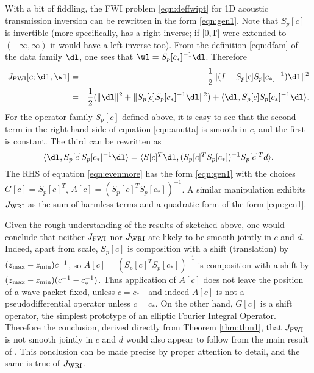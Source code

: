 With a bit of fiddling, the FWI problem \ref{eqn:deffwipt} for 1D 
acoustic transmission inversion can be rewritten in the form \ref{eqn:gen1}. Note
that $S_p[c]$ is invertible (more specifically, has a right inverse; if [0,T] were
extended to $(-\infty,\infty)$ it would have a left inverse too). From
the definition \ref{eqn:dfam} of the data family $\dl$, one sees that
$\wl = S_p[c_*]^{-1}\dl$. Therefore
\begin{eqnarray}
  \label{eqn:anutta}
  J_{\rm FWI}[c;\dl,\wl] &=&
                             \frac{1}{2}\|(I-S_p[c]S_p[c_*]^{-1})\dl\|^2 \nonumber\\
 & =&\frac{1}{2}(\|\dl\|^2 + \|S_p[c]S_p[c_*]^{-1}\dl\|^2) + \langle \dl,
  S_p[c]S_p[c_*]^{-1}\dl\rangle.
\end{eqnarray}
For the operator family $S_p[c]$ defined above, it is easy to see that
the second term in the right hand side of equation \ref{eqn:anutta} is
smooth in $c$, and the first is constant. The third can be rewritten
as
\begin{equation}
  \label{eqn:evenmore}
  \langle \dl,  S_p[c]S_p[c_*]^{-1}\dl\rangle = \langle S[c]^T\dl, 
  (S_p[c]^T S_p[c_*])^{-1}S_p[c]^Td\rangle.
\end{equation}
The RHS of equation \ref{eqn:evenmore} has the form \ref{eqn:gen1} with the choices $G[c]=S_p[c]^T$,
$A[c]=(S_p[c]^T S_p[c_*])^{-1}$. A similar manipulation exhibits
$J_{\rm WRI}$ as the sum of harmless terms and a quadratic form of the
form \ref{eqn:gen1}.

Given the rough understanding of the results of \cite{StolkSymes:03}
sketched above, one would conclude that neither $J_{\rm FWI}$ nor
$J_{\rm WRI}$ are likely to be smooth jointly in $c$ and $d$. Indeed,
apart from scale, $S_p[c]$ is composition with a shift (translation)
by $(z_{\rm max}-z_{\rm min})c^{-1}$, so
$A[c]=(S_p[c]^T S_p[c_*])^{-1}$ is composition with a shift by
$(z_{\rm max}-z_{\rm min})(c^{-1}-c_*^{-1})$. Thus application of
$A[c]$ does not leave the position of a wave packet fixed, unless
$c=c_*$ - and indeed $A[c]$ is not a pseudodifferential operator
unless $c=c_*$. On the other hand, $G[c]$ is a shift operator, the
simplest prototype of an elliptic Fourier Integral Operator. Therefore
the conclusion, derived directly from Theorem \ref{thm:thm1}, that
$J_{\rm FWI}$ is not smooth jointly in $c$ and $d$ would also appear
to follow from the main result of \cite[]{StolkSymes:03}. This
conclusion can be made precise by proper attention to detail, and the
same is true of $J_{\rm WRI}$.

